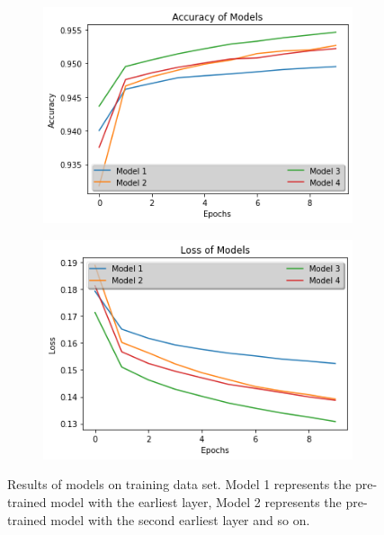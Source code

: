 \documentclass{article}
\begin{document}
\begin{figure}[h!]
    \centering
    \begin{subfigure}[b]{0.8\linewidth}
      \includegraphics[width=\linewidth]{accuracy.png}
    \end{subfigure}
    
    \begin{subfigure}[b]{0.8\linewidth}
      \includegraphics[width=\linewidth]{loss.png}
    \end{subfigure}
    \caption{Results of models on training data set. Model 1 represents the pre-trained model with the earliest layer, Model 2 represents the pre-trained model with the second earliest layer and so on.}
  \end{figure}
\end{document}
